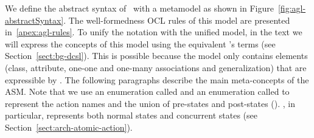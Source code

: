 
We define the abstract syntax of \agl~with a metamodel as shown in Figure~\ref{fig:agl-abstractSyntax}. The well-formedness OCL rules of this model are presented in~\ref{apex:agl-rules}. To unify the notation with the unified model, in the text we will express the concepts of this model using the equivalent \dcsl's terms (see Section~\ref{sect:bg-dcsl}). This is possible because the model only contains elements (class, attribute, one-one and one-many associations and generalization) that are expressible by \dcsl.
%
The following paragraphs describe the main meta-concepts of the ASM. Note that we use an enumeration called  and an enumeration called  to represent the action names and the union of pre-states and post-states (\resp). , in particular, represents both normal states and concurrent states (see Section~\ref{sect:arch-atomic-action}).
%
